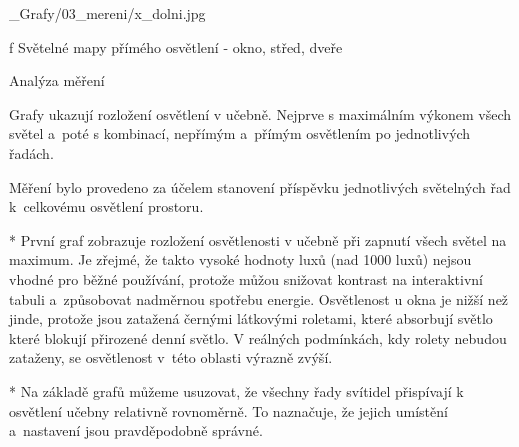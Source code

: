 \medskip {}
\picw=15cm _Grafy/03_mereni/x_dolni.jpg
\caption/f Světelné mapy přímého osvětlení - okno, střed, dveře
\medskip


\secc Analýza měření

Grafy ukazují rozložení osvětlení v učebně. Nejprve s maximálním výkonem všech světel a~poté s kombinací,
nepřímým a~přímým osvětlením po jednotlivých řadách.



Měření bylo provedeno za účelem stanovení příspěvku jednotlivých světelných řad k~celkovému osvětlení prostoru.

\medskip {}
\begitems
  * První graf zobrazuje rozložení osvětlenosti v učebně při zapnutí všech světel na maximum. Je zřejmé, že takto vysoké hodnoty luxů
    (nad 1000 luxů) nejsou vhodné pro běžné používání, protože můžou snižovat kontrast na interaktivní tabuli a~způsobovat nadměrnou
    spotřebu energie.
    Osvětlenost u okna je nižší než jinde, protože jsou zatažená černými látkovými roletami,
    které absorbují světlo které blokují přirozené denní světlo.
    V reálných podmínkách, kdy rolety nebudou zataženy, se osvětlenost v~této oblasti výrazně zvýší.
\enditems


\medskip {}


\begitems
    * Na základě grafů můžeme usuzovat, že všechny řady svítidel přispívají k osvětlení učebny relativně rovnoměrně.
        To naznačuje, že jejich umístění a~nastavení jsou pravděpodobně správné.
\enditems

\medskip {}


